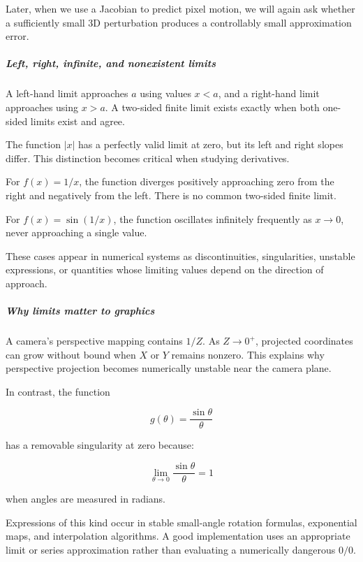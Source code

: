 Later, when we use a Jacobian to predict pixel motion, we will again ask whether a sufficiently small 3D perturbation produces a controllably small approximation error.

\subparagraph{Left, right, infinite, and nonexistent limits}\label{01-foundations-i-ch020-left-right-infinite-and-nonexistent-limits}

\hypertarget{01-foundations-i-ch020-left-right-infinite-and-nonexistent-limits}{}

A left-hand limit approaches \(a\) using values \(x<a\), and a right-hand limit approaches using \(x>a\). A two-sided finite limit exists exactly when both one-sided limits exist and agree.

The function \(|x|\) has a perfectly valid limit at zero, but its left and right slopes differ. This distinction becomes critical when studying derivatives.

For \(f(x)=1/x\), the function diverges positively approaching zero from the right and negatively from the left. There is no common two-sided finite limit.

For \(f(x)=\sin(1/x)\), the function oscillates infinitely frequently as \(x\to0\), never approaching a single value.

These cases appear in numerical systems as discontinuities, singularities, unstable expressions, or quantities whose limiting values depend on the direction of approach.

\subparagraph{Why limits matter to graphics}\label{01-foundations-i-ch020-why-limits-matter-to-graphics}

\hypertarget{01-foundations-i-ch020-why-limits-matter-to-graphics}{}

A camera's perspective mapping contains \(1/Z\). As \(Z\to0^+\), projected coordinates can grow without bound when \(X\) or \(Y\) remains nonzero. This explains why perspective projection becomes numerically unstable near the camera plane.

In contrast, the function

\[
g(\theta)=\frac{\sin\theta}{\theta}
\]

has a removable singularity at zero because:

\[
\lim_{\theta\to0}\frac{\sin\theta}{\theta}=1
\]

when angles are measured in radians.

Expressions of this kind occur in stable small-angle rotation formulas, exponential maps, and interpolation algorithms. A good implementation uses an appropriate limit or series approximation rather than evaluating a numerically dangerous \(0/0\).

